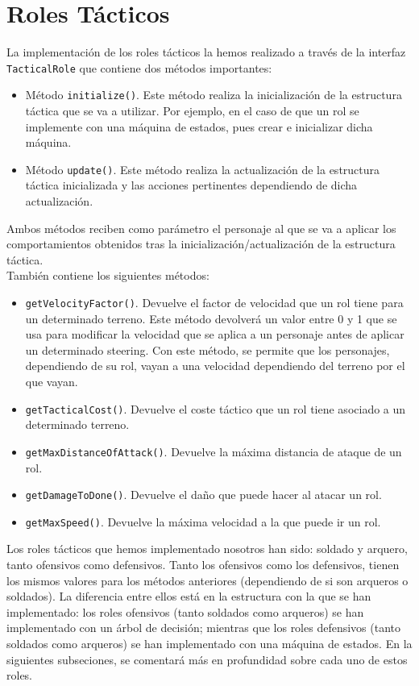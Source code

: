 \medskip
\section{Roles Tácticos}
La implementación de los roles tácticos la hemos realizado a través de la interfaz \texttt{TacticalRole} que contiene dos métodos importantes:
\begin{itemize}
 \item Método \texttt{initialize()}. Este método realiza la inicialización de la estructura táctica que se va a utilizar. Por ejemplo, en el caso de que un rol se implemente con una máquina de estados, pues crear e inicializar dicha máquina.
 \item Método \texttt{update()}. Este método realiza la actualización de la estructura táctica inicializada y las acciones pertinentes dependiendo de dicha actualización.
\end{itemize}

Ambos métodos reciben como parámetro el personaje al que se va a aplicar los comportamientos obtenidos tras la inicialización/actualización de la estructura táctica. \\

También contiene los siguientes métodos:
\begin{itemize}
 \item \texttt{getVelocityFactor()}. Devuelve el factor de velocidad que un rol tiene para un determinado terreno. Este método devolverá un valor entre 0 y 1 que se usa para modificar la velocidad que se aplica a un personaje antes de aplicar un determinado steering. Con este método, se permite que los personajes, dependiendo de su rol, vayan a una velocidad dependiendo del terreno por el que vayan.
 \item \texttt{getTacticalCost()}. Devuelve el coste táctico que un rol tiene asociado a un determinado terreno. 
 \item \texttt{getMaxDistanceOfAttack()}. Devuelve la máxima distancia de ataque de un rol.
 \item \texttt{getDamageToDone()}. Devuelve el daño que puede hacer al atacar un rol.
 \item \texttt{getMaxSpeed()}. Devuelve la máxima velocidad a la que puede ir un rol.
\end{itemize}

Los roles tácticos que hemos implementado nosotros han sido: soldado y arquero, tanto ofensivos como defensivos. Tanto los ofensivos como los defensivos, tienen los mismos valores para los métodos anteriores (dependiendo de si son arqueros o soldados). La diferencia entre ellos está en la estructura con la que se han implementado: los roles ofensivos (tanto soldados como arqueros) se han implementado con un árbol de decisión; mientras que los roles defensivos (tanto soldados como arqueros) se han implementado con una máquina de estados. En la siguientes subseciones, se comentará más en profundidad sobre cada uno de estos roles. \\


